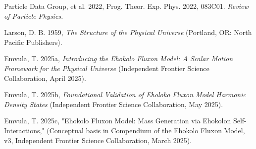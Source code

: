\documentclass[11pt]{article}
\begin{document}
 
\begin{thebibliography}{99}
\raggedright
{}
Particle Data Group, et al. 2022, Prog. Theor. Exp. Phys. 2022, 083C01. 
\textit{Review of Particle Physics.}

Larson, D. B. 1959, \textit{The Structure of the Physical Universe} (Portland, OR: North Pacific Publishers).

Emvula, T. 2025a, \textit{Introducing the Ehokolo Fluxon Model: A Scalar Motion Framework for the Physical Universe} (Independent Frontier Science Collaboration, April 2025). 

Emvula, T. 2025b, \textit{Foundational Validation of Eholoko Fluxon Model Harmonic Density States} (Independent Frontier Science Collaboration, May 2025).

Emvula, T. 2025c, "Ehokolo Fluxon Model: Mass Generation via Ehokolon Self-Interactions," (Conceptual basis in Compendium of the Ehokolo Fluxon Model, v3, Independent Frontier Science Collaboration, March 2025).

\end{thebibliography}
\end{document}
